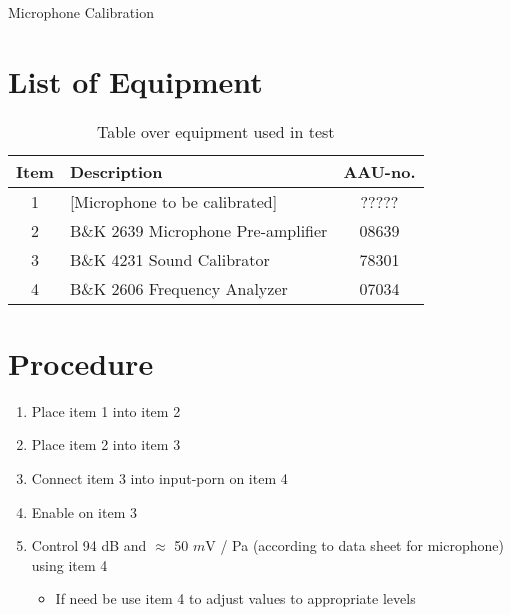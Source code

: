 \documentclass[12pt,a4paper,openright]{article}
\newcommand{\ra}[1]{\renewcommand{\arraystretch}{#1}}
\begin{document}
\begin{Huge}
\begin{center}
Microphone Calibration
\end{center}
\end{Huge}


\section{List of Equipment}
\begin{table}[h]
	\centering
	\ra{1.3}
	\begin{tabular}{ c l c } \toprule
		{Item} &	{Description} & {AAU-no}. \\ \bottomrule 
		1	&	[Microphone to be calibrated]			& ?????			\\
		2	&	B\&K 2639 Microphone Pre-amplifier		& 08639			\\  
		3	&	B\&K 4231 Sound Calibrator				& 78301			\\
		4	&	B\&K 2606 Frequency Analyzer			& 07034			\\ \bottomrule 
	\end{tabular}
	\caption{Table over equipment used in test}
	\label{tab:UsedEquipmentListning}
\end{table}

\section{Procedure}
\begin{enumerate}
	\item Place item 1 into item 2
	\item Place item 2 into item 3
	\item Connect item 3 into input-porn on item 4
	\item Enable on item 3
	\item Control 94 dB and $\approx$ 50 $m$V / Pa (according to data sheet for microphone) using item 4
	\begin{itemize}
		\item If need be use item 4 to adjust values to appropriate levels
	\end{itemize}
\end{enumerate}
\end{document}
